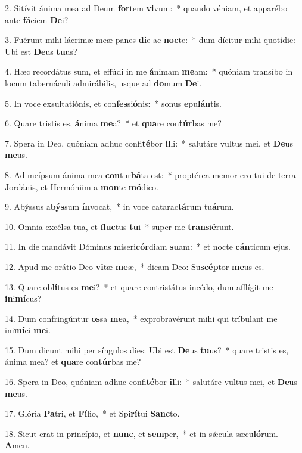 2. Sitívit ánima mea ad Deum \textbf{for}tem \textbf{vi}vum:~*  quando véniam, et apparébo ante \textbf{fá}ciem \textbf{De}i?\

3. Fuérunt mihi lácrimæ meæ panes \textbf{di}e ac \textbf{noc}te:~*  dum dícitur mihi quotídie: Ubi est \textbf{De}us \textbf{tu}us?\

4. Hæc recordátus sum, et effúdi in me \textbf{á}nimam \textbf{me}am:~*  quóniam transíbo in locum tabernáculi admirábilis, usque ad \textbf{do}mum \textbf{De}i.\

5. In voce exsultatiónis, et con\textbf{fes}si\textbf{ó}nis:~*  sonus \textbf{e}pu\textbf{lán}tis.\

6. Quare tristis es, \textbf{á}nima \textbf{me}a?~*  et \textbf{qua}re con\textbf{túr}bas me?\

7. Spera in Deo, quóniam adhuc confi\textbf{té}bor \textbf{il}li:~*  salutáre vultus mei, et \textbf{De}us \textbf{me}us.\

8. Ad meípsum ánima mea \textbf{con}tur\textbf{bá}ta est:~*  proptérea memor ero tui de terra Jordánis, et Hermóniim a \textbf{mon}te \textbf{mó}dico.\

9. Abýssus a\textbf{býs}sum \textbf{ín}vocat,~*  in voce catarac\textbf{tá}rum tu\textbf{á}rum.\

10. Omnia excélsa tua, et \textbf{fluc}tus \textbf{tu}i~*  super me \textbf{trans}i\textbf{é}runt.\

11. In die mandávit Dóminus miseri\textbf{cór}diam \textbf{su}am:~*  et nocte \textbf{cán}ticum \textbf{e}jus.\

12. Apud me orátio Deo \textbf{vi}tæ \textbf{me}æ,~*  dicam Deo: Su\textbf{scép}tor \textbf{me}us es.\

13. Quare ob\textbf{lí}tus es \textbf{me}i?~*  et quare contristátus incédo, dum afflígit me \textbf{in}i\textbf{mí}cus?\

14. Dum confringúntur \textbf{os}sa \textbf{me}a,~*  exprobravérunt mihi qui tríbulant me ini\textbf{mí}ci \textbf{me}i.\

15. Dum dicunt mihi per síngulos dies: Ubi est \textbf{De}us \textbf{tu}us?~*  quare tristis es, ánima mea? et \textbf{qua}re con\textbf{túr}bas me?\

16. Spera in Deo, quóniam adhuc confi\textbf{té}bor \textbf{il}li:~*  salutáre vultus mei, et \textbf{De}us \textbf{me}us.\

17. Glória \textbf{Pa}tri, et \textbf{Fí}lio,~*  et Spi\textbf{rí}tui \textbf{Sanc}to.\

18. Sicut erat in princípio, et \textbf{nunc}, et \textbf{sem}per,~*  et in sǽcula sæcu\textbf{ló}rum. \textbf{A}men.\

